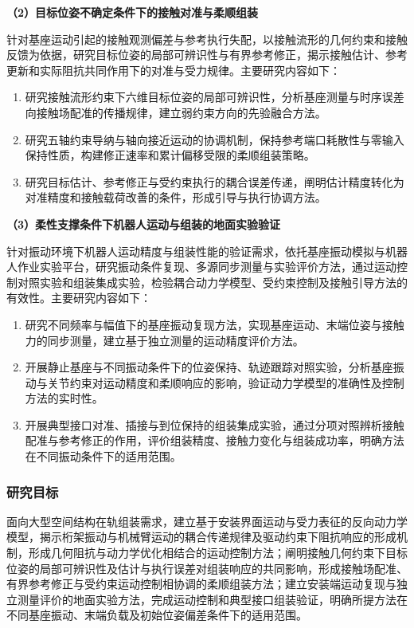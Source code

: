 \documentclass[UTF8,a4paper,zihao=-4,fontset=fandol]{ctexart}
\newcommand{\topic}[1]{\par\Needspace{4\baselineskip}\addvspace{0.5em}\noindent\textbf{#1}\par\nobreak}
\begin{document}
\topic{（2）目标位姿不确定条件下的接触对准与柔顺组装}

针对基座运动引起的接触观测偏差与参考执行失配，以接触流形的几何约束和接触反馈为依据，研究目标位姿的局部可辨识性与有界参考修正，揭示接触估计、参考更新和实际阻抗共同作用下的对准与受力规律。主要研究内容如下：
\begin{enumerate}[label=\arabic*)]
 \item 研究接触流形约束下六维目标位姿的局部可辨识性，分析基座测量与时序误差向接触场配准的传播规律，建立弱约束方向的先验融合方法。
 \item 研究五轴约束导纳与轴向接近运动的协调机制，保持参考端口耗散性与零输入保持性质，构建修正速率和累计偏移受限的柔顺组装策略。
 \item 研究目标估计、参考修正与受约束执行的耦合误差传递，阐明估计精度转化为对准精度和接触载荷改善的条件，形成引导与执行协调方法。
\end{enumerate}

\topic{（3）柔性支撑条件下机器人运动与组装的地面实验验证}

针对振动环境下机器人运动精度与组装性能的验证需求，依托基座振动模拟与机器人作业实验平台，研究振动条件复现、多源同步测量与实验评价方法，通过运动控制对照实验和组装集成实验，检验耦合动力学模型、受约束控制及接触引导方法的有效性。主要研究内容如下：
\begin{enumerate}[label=\arabic*)]
  \item 研究不同频率与幅值下的基座振动复现方法，实现基座运动、末端位姿与接触力的同步测量，建立基于独立测量的运动精度评价方法。
  \item 开展静止基座与不同振动条件下的位姿保持、轨迹跟踪对照实验，分析基座振动与关节约束对运动精度和柔顺响应的影响，验证动力学模型的准确性及控制方法的实时性。
  \item 开展典型接口对准、插接与到位保持的组装集成实验，通过分项对照辨析接触配准与参考修正的作用，评价组装精度、接触力变化与组装成功率，明确方法在不同振动条件下的适用范围。
\end{enumerate}

\subsubsection{研究目标}

面向大型空间结构在轨组装需求，建立基于安装界面运动与受力表征的反向动力学模型，揭示桁架振动与机械臂运动的耦合传递规律及驱动约束下阻抗响应的形成机制，形成几何阻抗与动力学优化相结合的运动控制方法；阐明接触几何约束下目标位姿的局部可辨识性及估计与执行误差对组装响应的共同影响，形成接触场配准、有界参考修正与受约束运动控制相协调的柔顺组装方法；建立安装端运动复现与独立测量评价的地面实验方法，完成运动控制和典型接口组装验证，明确所提方法在不同基座振动、末端负载及初始位姿偏差条件下的适用范围。
\end{document}
